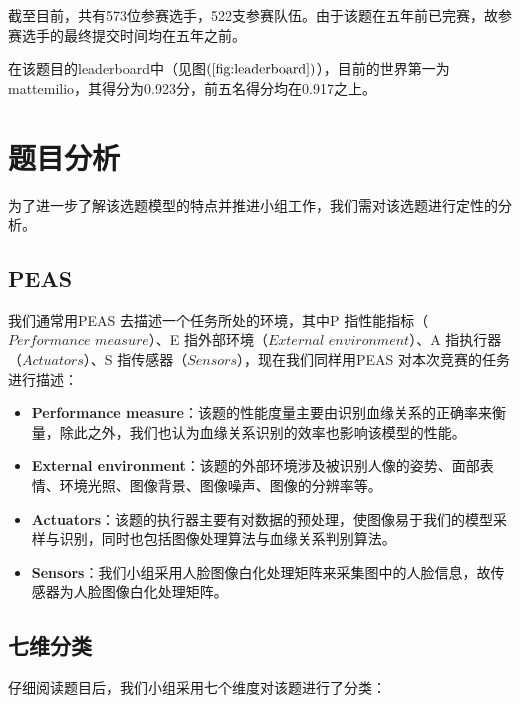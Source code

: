 \documentclass[UTF8]{ctexart}
\begin{document}
截至目前，共有573位参赛选手，522支参赛队伍。由于该题在五年前已完赛，故参赛选手的最终提交时间均在五年之前。

在该题目的leaderboard中（见图$\left(\ref{fig:leaderboard}\right)$），目前的世界第一为mattemilio，其得分为0.923分，前五名得分均在0.917之上。

\section{题目分析}
为了进一步了解该选题模型的特点并推进小组工作，我们需对该选题进行定性的分析。
\subsection{PEAS}

我们通常用PEAS 去描述一个任务所处的环境，其中P 指性能指标（$\textit{Performance measure}$）、E 指外部环境（$\textit{External environment}$）、A 指执行器（$\textit{Actuators}$）、S 指传感器（$\textit{Sensors}$），现在我们同样用PEAS 对本次竞赛的任务进行描述：

\begin{itemize}
  \item \textbf{Performance measure}：该题的性能度量主要由识别血缘关系的正确率来衡量，除此之外，我们也认为血缘关系识别的效率也影响该模型的性能。
  \item \textbf{External environment}：该题的外部环境涉及被识别人像的姿势、面部表情、环境光照、图像背景、图像噪声、图像的分辨率等。
  \item \textbf{Actuators}：该题的执行器主要有对数据的预处理，使图像易于我们的模型采样与识别，同时也包括图像处理算法与血缘关系判别算法。
  \item \textbf{Sensors}：我们小组采用人脸图像白化处理矩阵来采集图中的人脸信息，故传感器为人脸图像白化处理矩阵。
\end{itemize}

\subsection{七维分类}
仔细阅读题目后，我们小组采用七个维度对该题进行了分类：
\end{document}
